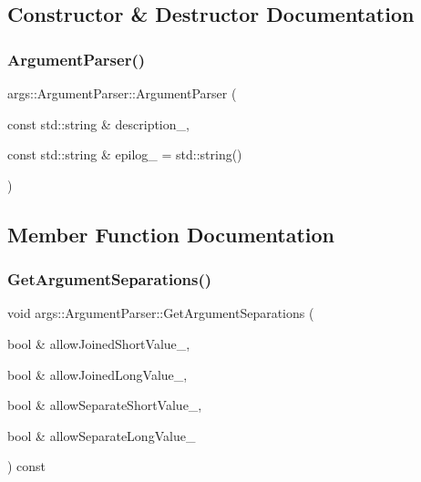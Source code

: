 \subsection{Constructor \& Destructor Documentation}
\mbox{\label{classargs_1_1_argument_parser_a48265b3dc87a042e7c02846dd451b06e}} 
\subsubsection{\texorpdfstring{Argument\+Parser()}{ArgumentParser()}}
{\footnotesize\ttfamily args\+::\+Argument\+Parser\+::\+Argument\+Parser (\begin{DoxyParamCaption}\item[{const std\+::string \&}]{description\+\_\+,  }\item[{const std\+::string \&}]{epilog\+\_\+ = {\ttfamily std\+:\+:string()} }\end{DoxyParamCaption})\hspace{0.3cm}{\ttfamily [inline]}}



\subsection{Member Function Documentation}
\mbox{\label{classargs_1_1_argument_parser_aba2c63676eeb73db2ea857a03e421513}} 
\subsubsection{\texorpdfstring{Get\+Argument\+Separations()}{GetArgumentSeparations()}}
{\footnotesize\ttfamily void args\+::\+Argument\+Parser\+::\+Get\+Argument\+Separations (\begin{DoxyParamCaption}\item[{bool \&}]{allow\+Joined\+Short\+Value\+\_\+,  }\item[{bool \&}]{allow\+Joined\+Long\+Value\+\_\+,  }\item[{bool \&}]{allow\+Separate\+Short\+Value\+\_\+,  }\item[{bool \&}]{allow\+Separate\+Long\+Value\+\_\+ }\end{DoxyParamCaption}) const\hspace{0.3cm}{\ttfamily [inline]}}

